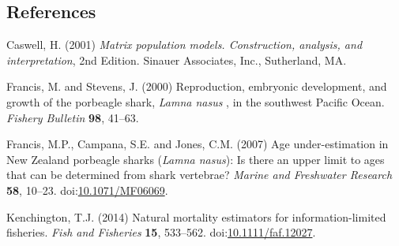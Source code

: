 \documentclass[]{article}
\begin{document}
\subsection*{References}\label{references}

\hypertarget{refs}{}
\hypertarget{ref-caswell_matrix_2001}{}
Caswell, H. (2001) \emph{Matrix population models. Construction,
analysis, and interpretation}, 2nd Edition. Sinauer Associates, Inc.,
Sutherland, MA.

\hypertarget{ref-francis_reproduction_2000}{}
Francis, M. and Stevens, J. (2000) Reproduction, embryonic development,
and growth of the porbeagle shark, \emph{Lamna nasus} , in the southwest
Pacific Ocean. \emph{Fishery Bulletin} \textbf{98}, 41--63.

\hypertarget{ref-francis_age_2007}{}
Francis, M.P., Campana, S.E. and Jones, C.M. (2007) Age under-estimation
in New Zealand porbeagle sharks (\emph{Lamna nasus}): Is there an upper
limit to ages that can be determined from shark vertebrae? \emph{Marine
and Freshwater Research} \textbf{58}, 10--23.
doi:\href{https://doi.org/10.1071/MF06069}{10.1071/MF06069}.

\hypertarget{ref-kenchington_natural_2014}{}
Kenchington, T.J. (2014) Natural mortality estimators for
information-limited fisheries. \emph{Fish and Fisheries} \textbf{15},
533--562.
doi:\href{https://doi.org/10.1111/faf.12027}{10.1111/faf.12027}.
\end{document}
